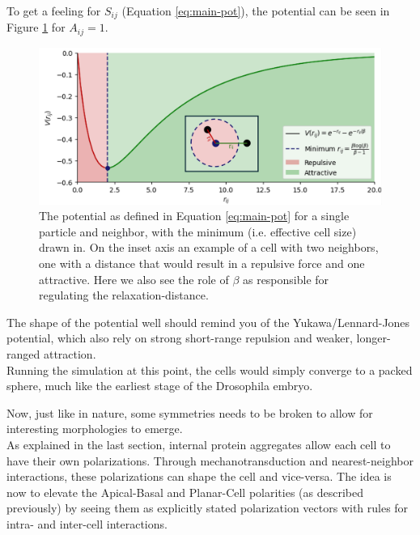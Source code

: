 To get a feeling for $S_{ij}$ (Equation \ref{eq:main-pot}), the potential can be seen in Figure \ref{fig:potential} for $A_{ij}=1$.
\begin{figure}[H]
    \centering
    \includegraphics[width=1.\linewidth]{chapters/Theory/figures/potential_annotated.png}
    \caption{The potential as defined in Equation \ref{eq:main-pot} for a single particle and neighbor, with the minimum (i.e. effective cell size) drawn in. On the inset axis an example of a cell with two neighbors, one with a distance that would result in a repulsive force and one attractive. Here we also see the role of $\beta$ as responsible for regulating the relaxation-distance.}
    \label{fig:potential}
\end{figure}

The shape of the potential well should remind you of the Yukawa/Lennard-Jones potential, which also rely on strong short-range repulsion and weaker, longer-ranged attraction.\\

Running the simulation at this point, the cells would simply converge to a packed sphere, much like the earliest stage of the Drosophila embryo.






Now, just like in nature, some symmetries needs to be broken to allow for interesting morphologies to emerge.\\

As explained in the last section, internal protein aggregates allow each cell to have their own polarizations. Through mechanotransduction and nearest-neighbor interactions, these polarizations can shape the cell and vice-versa. The idea is now to elevate the Apical-Basal and Planar-Cell polarities (as described previously) by seeing them as explicitly stated polarization vectors with rules for intra- and inter-cell interactions. \\

